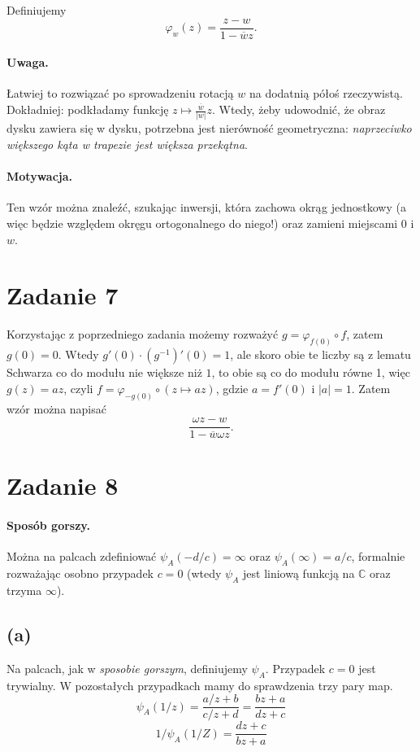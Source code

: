 Definiujemy
\[ 
    \varphi_w(z) = \frac{z - w}{1 - \overline{w}z}.
\]


\paragraph{Uwaga.} Łatwiej to rozwiązać po sprowadzeniu rotacją \( w \) na dodatnią półoś rzeczywistą. Dokładniej: podkładamy funkcję \( z \mapsto \frac{\overline{w}}{ \left| w \right|  }z \). Wtedy, żeby udowodnić, że obraz dysku zawiera się w dysku, potrzebna jest nierówność geometryczna: \textit{naprzeciwko większego kąta w trapezie jest większa przekątna}.

\paragraph{Motywacja.} Ten wzór można znaleźć, szukając inwersji, która zachowa okrąg jednostkowy (a więc będzie względem okręgu ortogonalnego do niego!) oraz zamieni miejscami \( 0 \) i \( w \).

\section*{Zadanie 7}

Korzystając z poprzedniego zadania możemy rozważyć \( g = \varphi_{f(0)} \circ f \), zatem \( g(0) = 0 \). Wtedy \( g'(0) \cdot (g^{-1})'(0) = 1 \), ale skoro obie te liczby są z lematu Schwarza co do modułu nie większe niż \( 1 \), to obie są co do modułu równe 1, więc \( g(z) = az \), czyli \( f = \varphi_{-g(0)} \circ (z \mapsto az) \), gdzie \( a = f'(0) \) i \( |a| = 1 \). Zatem wzór można napisać
\[ 
    \frac{\omega z - w}{1 - \overline{w}\omega z}.
\]

\section*{Zadanie 8}

\paragraph{Sposób gorszy.} Można na palcach zdefiniować \( \psi_A(-d/c) = \infty \) oraz \( \psi_A(\infty) = a/c \), formalnie rozważając osobno przypadek \( c = 0 \) (wtedy \( \psi_A \) jest liniową funkcją na \( \mathbb{C} \) oraz trzyma \( \infty \)).

\subsection*{(a)}
Na palcach, jak w \textit{sposobie gorszym}, definiujemy \( \psi_A \). Przypadek \( c = 0 \) jest trywialny. W pozostałych przypadkach mamy do sprawdzenia trzy pary map.
\[ 
    \psi_A(1/z) = \frac{a/z + b}{c/z + d} = \frac{bz + a}{dz + c} 
\]
\[ 
    1/\psi_A(1/Z) =  \frac{dz + c}{bz + a}
\]

